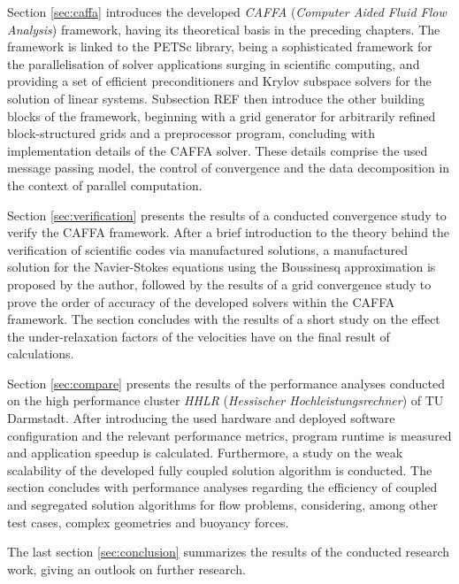 Section \ref{sec:caffa} introduces the developed \emph{CAFFA} (\emph{Computer Aided Fluid Flow Analysis}) framework, having its theoretical basis in the preceding chapters. The framework is linked to the PETSc library, being a sophisticated framework for the parallelisation of solver applications surging in scientific computing, and providing a set of efficient preconditioners and Krylov subspace solvers for the solution of linear systems. Subsection REF then introduce the other building blocks of the framework, beginning with a grid generator for arbitrarily refined block-structured grids and a preprocessor program, concluding with implementation details of the CAFFA solver. These details comprise the used message passing model, the control of convergence and the data decomposition in the context of parallel computation.

Section \ref{sec:verification} presents the results of a conducted convergence study to verify the CAFFA framework. After a brief introduction to the theory behind the verification of scientific codes via manufactured solutions, a manufactured solution for the Navier-Stokes equations using the Boussinesq approximation is proposed by the author, followed by the results of a grid convergence study to prove the order of accuracy of the developed solvers within the CAFFA framework. The section concludes with the results of a short study on the effect the under-relaxation factors of the velocities have on the final result of calculations.

Section \ref{sec:compare} presents the results of the performance analyses conducted on the high performance cluster \emph{HHLR} (\emph{Hessischer Hochleistungsrechner}) of TU Darmstadt. After introducing the used hardware and deployed software configuration and the relevant performance metrics, program runtime is measured and application speedup is calculated. Furthermore, a study on the weak scalability of the developed fully coupled solution algorithm is conducted. The section concludes with performance analyses regarding the efficiency of coupled and segregated solution algorithms for flow problems, considering, among other test cases, complex geometries and buoyancy forces.

The last section \ref{sec:conclusion} summarizes the results of the conducted research work, giving an outlook on further research.

